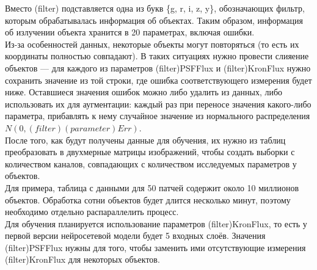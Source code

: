 Вместо (filter) подставляется одна из букв \{g, r, i, z, y\}, обозначающих фильтр, которым 
обрабатывалась информация об объектах. Таким образом, информация об излучении объекта хранится в 
20 параметрах, включая ошибки.\\

Из-за особенностей данных, некоторые объекты могут повторяться (то есть их координаты полностью 
совпадают). В таких ситуациях нужно провести слияение объектов --- для каждого из параметров 
(filter)PSFFlux и (filter)KronFlux нужно сохранить значение из той строки, где ошибка 
соответствующего измерения будет ниже. Оставшиеся значения ошибок можно либо удалить из данных, 
либо использовать их для аугментации: 
каждый раз при переносе значения какого-либо параметра, прибавлять к нему случайное значение из 
нормального распределения $N(0, (filter)(parameter)Err)$.\\

После того, как будут получены данные для обучения, их нужно из таблиц преобразовать в двухмерные 
матрицы изображений, чтобы создать выборки с количеством каналов, совпадающих с количеством 
исследуемых параметров у объектов. \\

Для примера, таблица с данными для 50 патчей содержит около 10 миллионов объектов. Обработка 
сотни объектов будет длится несколько минут, поэтому необходимо отдельно распараллелить процесс.\\

Для обучения планируется использование параметров (filter)KronFlux, то есть у первой версии 
нейросетевой модели будет 5 входных слоёв. Значения (filter)PSFFlux нужны для того, чтобы заменить 
ими отсутствующие измерения (filter)KronFlux для некоторых объектов.\\
